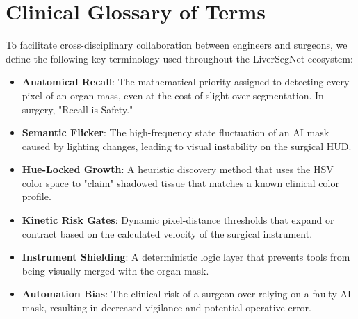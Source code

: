 \documentclass[conference]{IEEEtran}
\begin{document}
\section{Clinical Glossary of Terms}
To facilitate cross-disciplinary collaboration between engineers and surgeons, we define the following key terminology used throughout the LiverSegNet ecosystem:
\begin{itemize}
    \item \textbf{Anatomical Recall}: The mathematical priority assigned to detecting every pixel of an organ mass, even at the cost of slight over-segmentation. In surgery, "Recall is Safety."
    \item \textbf{Semantic Flicker}: The high-frequency state fluctuation of an AI mask caused by lighting changes, leading to visual instability on the surgical HUD.
    \item \textbf{Hue-Locked Growth}: A heuristic discovery method that uses the HSV color space to "claim" shadowed tissue that matches a known clinical color profile.
    \item \textbf{Kinetic Risk Gates}: Dynamic pixel-distance thresholds that expand or contract based on the calculated velocity of the surgical instrument.
    \item \textbf{Instrument Shielding}: A deterministic logic layer that prevents tools from being visually merged with the organ mask.
    \item \textbf{Automation Bias}: The clinical risk of a surgeon over-relying on a faulty AI mask, resulting in decreased vigilance and potential operative error.
\end{itemize}
\end{document}
